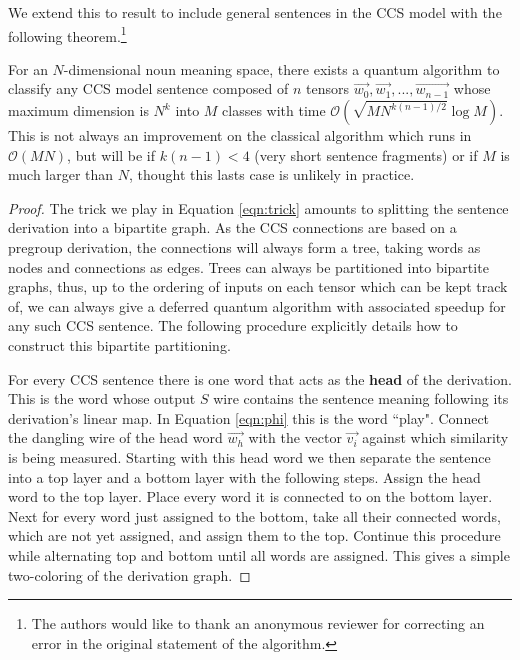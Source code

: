 We extend this to result to include general sentences in the CCS model with the following theorem.\footnote{The authors would like to thank an anonymous reviewer for correcting an error in the original statement of the algorithm.}

\begin{theorem}
For an $N$-dimensional noun meaning space, there exists a quantum algorithm to classify any CCS model sentence composed of $n$ tensors $\vec{w_0},\vec{w_1},...,\vec{w_{n-1}}$ whose maximum dimension is $N^k$ into $M$ classes with time $\mathcal{O}(\sqrt{M N^{k(n-1)/2}} \log M)$. This is not always an improvement on the classical algorithm which runs in $\mathcal{O}(MN)$, but will be if $k(n-1) < 4$ (very short sentence fragments) or if $M$ is much larger than $N$, thought this lasts case is unlikely in practice.
\end{theorem}
\begin{proof}
The trick we play in Equation \ref{eqn:trick} amounts to splitting the sentence derivation into a bipartite graph.  As the CCS connections are based on a pregroup derivation, the connections will always form a tree, taking words as nodes and connections as edges. Trees can always be partitioned into bipartite graphs, thus, up to the ordering of inputs on each tensor which can be kept track of, we can always give a deferred quantum algorithm with associated speedup for any such CCS sentence.
 The following procedure explicitly details how to construct this bipartite partitioning.

For every CCS sentence there is one word that acts as the \textbf{head} of the derivation.  This is the word whose output $S$ wire contains the sentence meaning following its derivation's linear map. In Equation \ref{eqn:phi} this is the word ``play". Connect the dangling wire of the head word $\vec{w_h}$ with the vector $\vec{v_i}$ against which similarity is being measured.  Starting with this head word we then separate the sentence into a top layer and a bottom layer with the following steps.  Assign the head word to the top layer. Place every word it is connected to on the bottom layer. Next for every word just assigned to the bottom, take all their connected words, which are not yet assigned, and assign them to the top.  Continue this procedure while alternating top and bottom until all words are assigned. This gives a simple two-coloring of the derivation graph. 
\end{proof}

